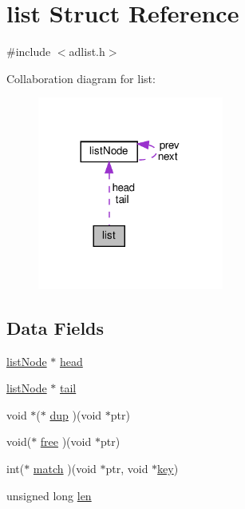 \hypertarget{structlist}{}\section{list Struct Reference}
\label{structlist}


{\ttfamily \#include $<$adlist.\+h$>$}



Collaboration diagram for list\+:
\nopagebreak
\begin{figure}[H]
\begin{center}
\leavevmode
\includegraphics[width=173pt]{structlist__coll__graph}
\end{center}
\end{figure}
\subsection*{Data Fields}
\begin{DoxyCompactItemize}
\item 
\hyperlink{structlist_node}{list\+Node} $\ast$ \hyperlink{structlist_aeafa6e94f6b451fac36e305798d4d656}{head}
\item 
\hyperlink{structlist_node}{list\+Node} $\ast$ \hyperlink{structlist_a769990d42e7c5a221c6a517bef9c19c0}{tail}
\item 
void $\ast$($\ast$ \hyperlink{structlist_acb324bb20395015fe8cb806e767ef7ad}{dup} )(void $\ast$ptr)
\item 
void($\ast$ \hyperlink{structlist_a7ffa51abb1dd8bc3fe4627cb1d2405c5}{free} )(void $\ast$ptr)
\item 
int($\ast$ \hyperlink{structlist_aff6f26982c3b0583ccfd1ca09f8e624e}{match} )(void $\ast$ptr, void $\ast$\hyperlink{redis-check-rdb_8c_adc0ee0ed345db513fb6fac27511be4f1}{key})
\item 
unsigned long \hyperlink{structlist_af2e72f8a5bf4bcdb77566c2936d5f13d}{len}
\end{DoxyCompactItemize}


